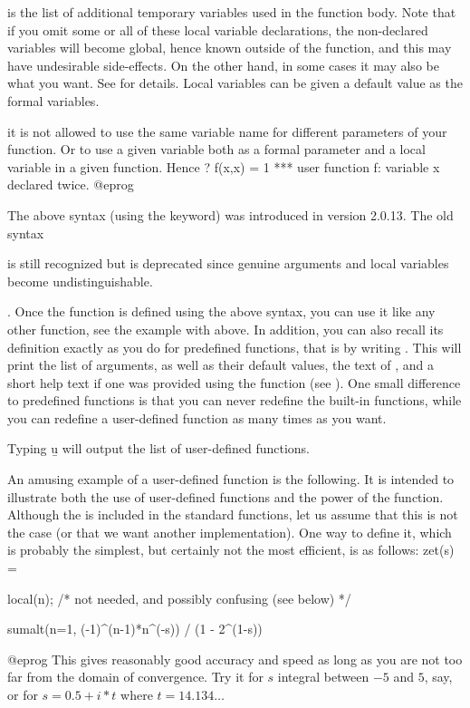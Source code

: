 \noindent {} is the list of additional temporary
variables used in the function body. Note that if you omit some or all of
these local variable declarations, the non-declared variables will become
global, hence known outside of the function, and this may have undesirable
side-effects. On the other hand, in some cases it may also be what you want.
See  for details. Local variables can be given a default
value as the formal variables.

 it is not allowed to use the same
variable name for different parameters of your function. Or to use a given
variable both as a formal parameter and a local variable in a given function.
Hence
\bprog
? f(x,x) = 1
  ***   user function f: variable x declared twice.
@eprog

 The above syntax (using the  keyword) was
introduced in version 2.0.13. The old syntax

%

\noindent is still recognized but is deprecated since genuine arguments and
local variables become undistinguishable.

. Once the function is defined using the above syntax, you can
use it like any other function, see the example with  above. In
addition, you can also recall its definition exactly as you do for predefined
functions, that is by writing . This will print the list of
arguments, as well as their default values, the text of , and a
short help text if one was provided using the  function (see
). One small difference to predefined functions is that
you can never redefine the built-in functions, while you can redefine a
user-defined function as many times as you want.

Typing \b{u} will output the list of user-defined functions.

An amusing example of a user-defined function is the following. It is
intended to illustrate both the use of user-defined functions and the power
of the  function. Although the  is
included in the standard functions, let us assume that this is not the case
(or that we want another implementation). One way to define it, which is
probably the simplest, but certainly not the most efficient, is as
follows:
\bprog
zet(s) =
{ local(n); /* not needed, and possibly confusing (see below) */

  sumalt(n=1, (-1)^(n-1)*n^(-s)) / (1 - 2^(1-s))
}
@eprog
\noindent This gives reasonably good accuracy and speed as long as you are
not too far from the domain of convergence. Try it for $s$ integral between
$-5$ and $5$, say, or for $s=0.5+i*t$ where $t=14.134\dots$

